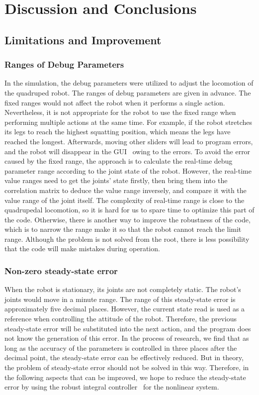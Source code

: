 \chapter{Discussion and Conclusions}


\section{Limitations and Improvement}
\subsection{Ranges of Debug Parameters}
In the simulation, the debug parameters were utilized to adjust the locomotion of the quadruped robot. The ranges of debug parameters are given in advance. The fixed ranges would not affect the robot when it performs a single action. Nevertheless, it is not appropriate for the robot to use the fixed range when performing multiple actions at the same time. For example, if the robot stretches its legs to reach the highest squatting position, which means the legs have reached the longest. Afterwards, moving other sliders will lead to program errors, and the robot will disappear in the GUI~\cite{ref:GUI} owing to the errors. 
To avoid the error caused by the fixed range, the approach is to calculate the real-time debug parameter range according to the joint state of the robot. However, the real-time value ranges need to get the joints' state firstly, then bring them into the correlation matrix to deduce the value range inversely, and compare it with the value range of the joint itself. The complexity of real-time range is close to the quadrupedal locomotion, so it is hard for us to spare time to optimize this part of the code. Otherwise, there is another way to improve the robustness of the code, which is to narrow the range make it so that the robot cannot reach the limit range. Although the problem is not solved from the root, there is less possibility that the code will make mistakes during operation.

\subsection{Non-zero steady-state error}
When the robot is stationary, its joints are not completely static. The robot's joints would move in a minute range. The range of this steady-state error is approximately five decimal places. However, the current state read is used as a reference when controlling the attitude of the robot. Therefore, the previous steady-state error will be substituted into the next action, and the program does not know the generation of this error. In the process of research, we find that as long as the accuracy of the parameters is controlled in three places after the decimal point, the steady-state error can be effectively reduced. But in theory, the problem of steady-state error should not be solved in this way. Therefore, in the following aspects that can be improved, we hope to reduce the steady-state error by using the robust integral controller~\cite{ref:RNIcontrol} for the nonlinear system.


